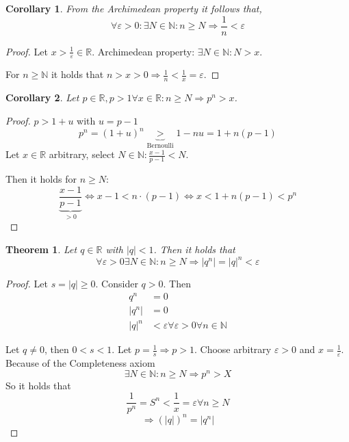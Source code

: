 \documentclass[a4paper,landscape,twocolumn]{article}
\newtheorem{theorem}{Theorem}
\newtheorem{cor}{Corollary}
\newcommand\abs[1]{\left|#1\right|}
\begin{document}
\begin{cor}
  From the Archimedean property it follows that,
  \[ \forall \varepsilon > 0: \exists N \in \mathbb N: n \geq N \Rightarrow \frac1n < \varepsilon \]
\end{cor}

\begin{proof}
  Let $x > \frac1\varepsilon \in \mathbb R$.
  Archimedean property: $\exists N \in \mathbb N: N > x$.

  For $n \geq \mathbb N$ it holds that $n > x > 0 \Rightarrow \frac1n < \frac1x = \varepsilon$.
\end{proof}

\begin{cor}
  Let $p \in \mathbb R, p > 1 \forall x \in \mathbb R: n \geq N \Rightarrow p^n > x$.
\end{cor}

\begin{proof}
  $p > 1 + u$ with $u = p - 1$
  \[ p^n = (1 + u)^n \underbrace{>}_{\text{Bernoulli}} 1 - nu = 1 + n(p-1) \]
  Let $x \in \mathbb R$ arbitrary, select $N \in \mathbb N: \frac{x-1}{p-1} < N$.

  Then it holds for $n \geq N:$
  \[
    \frac{x-1}{\underbrace{p-1}_{>0}}
    \Leftrightarrow x - 1 < n\cdot(p-1)
    \Leftrightarrow x < 1 + n(p-1) < p^n
  \]
\end{proof}

\begin{theorem}
  Let $q \in \mathbb R$ with $\abs{q} < 1$. Then it holds that
  \[
    \forall \varepsilon > 0 \exists N \in \mathbb N:
    n \geq N \Rightarrow \abs{q^n} = \abs{q}^n < \varepsilon
  \]
\end{theorem}

\begin{proof}
  Let $s = \abs{q} \geq 0$. Consider $q > 0$. Then
  \begin{align*}
    q^n &= 0 \\
    \abs{q^n} &= 0 \\
    \abs{q}^n &< \varepsilon \forall \varepsilon > 0 \forall n \in \mathbb N
  \end{align*}

  Let $q \neq 0$, then $0 < s < 1$. Let $p = \frac1s \Rightarrow p > 1$.
  Choose arbitrary $\varepsilon > 0$ and $x = \frac1\varepsilon$.
  Because of the Completeness axiom
  \[ \exists N \in \mathbb N: n \geq N \Rightarrow p^n > X \]
  So it holds that
  \[ \frac1{p^n} = S^n < \frac1x = \varepsilon \forall n \geq N \]
  \[ \Rightarrow \left(\abs{q}\right)^n = \abs{q^n} \]
\end{proof}
\end{document}
